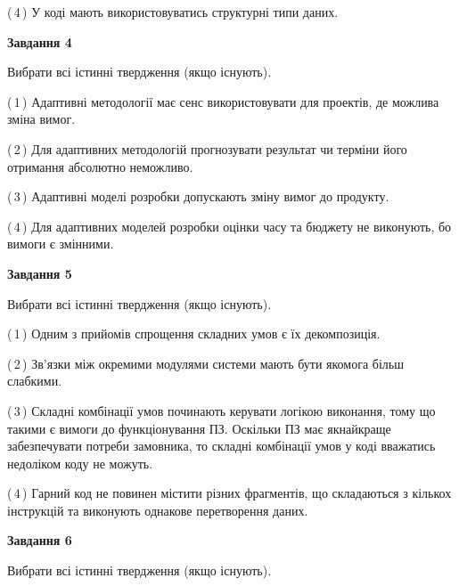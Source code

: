 \documentclass[10pt, ukrainian]{article}
\begin{document}
{\begin {large}
(\,4\,) У коді мають використовуватись структурні типи даних. %


{\begin {center}\textbf{Завдання 4}\end {center}}\par
Вибрати всі істинні твердження (якщо існують).\par
\vspace{2mm}



(\,1\,) Адаптивні методології має сенс використовувати для проектів, де можлива зміна вимог. %



(\,2\,) Для адаптивних методологій прогнозувати результат чи терміни його отримання абсолютно неможливо. %



(\,3\,) Адаптивні моделі розробки допускають зміну вимог до продукту. %



(\,4\,) Для адаптивних моделей розробки оцінки часу та бюджету не виконують, бо вимоги є змінними. %


{\begin {center}\textbf{Завдання 5}\end {center}}\par
Вибрати всі істинні твердження (якщо існують).\par
\vspace{2mm}



(\,1\,) Одним з прийомів спрощення складних умов є їх декомпозиція. %



(\,2\,) Зв'язки між окремими модулями системи мають бути якомога більш слабкими. %



(\,3\,) Складні комбінації умов починають керувати логікою виконання, тому що такими є вимоги до функціонування ПЗ. Оскільки ПЗ має якнайкраще забезпечувати потреби замовника, то складні комбінації умов у коді вважатись недоліком коду не можуть. %



(\,4\,) Гарний код не повинен містити різних фрагментів, що складаються з кількох інструкцій та виконують однакове перетворення даних. %

\newpage

{\begin {center}\textbf{Завдання 6}\end {center}}\par
Вибрати всі істинні твердження (якщо існують).\par
\vspace{2mm}




\end{large}}
\end{document}
